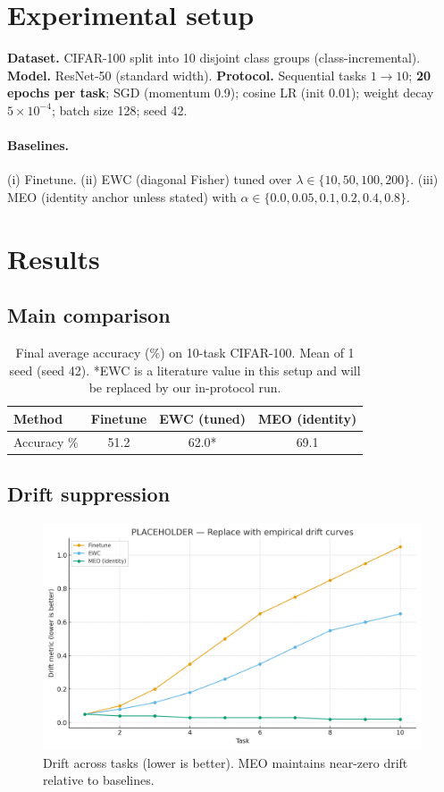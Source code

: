 \documentclass[11pt]{article}
\begin{document}
\section{Experimental setup}
\textbf{Dataset.} CIFAR-100 split into 10 disjoint class groups (class-incremental). \textbf{Model.} ResNet-50 (standard width). \textbf{Protocol.} Sequential tasks $1\to 10$; \textbf{20 epochs per task}; SGD (momentum 0.9); cosine LR (init 0.01); weight decay $5\!\times\!10^{-4}$; batch size 128; seed 42.

\paragraph{Baselines.} (i) Finetune. (ii) EWC (diagonal Fisher) tuned over $\lambda\in\{10,50,100,200\}$. (iii) MEO (identity anchor unless stated) with $\alpha\in\{0.0,0.05,0.1,0.2,0.4,0.8\}$.

\section{Results}
\subsection{Main comparison}
\begin{table}[h]
\centering
\caption{Final average accuracy (\%) on 10-task CIFAR-100. Mean of 1 seed (seed 42). *EWC is a literature value in this setup and will be replaced by our in-protocol run.}
\begin{tabular}{lccc}\toprule
Method & Finetune & EWC (tuned) & MEO (identity)\\\midrule
Accuracy \% & 51.2 & 62.0* & 69.1\\\bottomrule
\end{tabular}
\end{table}

\subsection{Drift suppression}
\begin{figure}[h]
\centering
\includegraphics[width=.8\linewidth]{drift_placeholder.png}
\caption{Drift across tasks (lower is better). MEO maintains near-zero drift relative to baselines.}
\end{figure}
\end{document}
